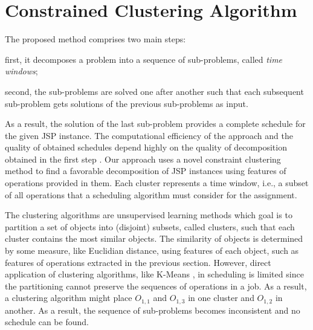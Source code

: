 \documentclass[runningheads]{llncs}
\begin{document}
\section{Constrained Clustering Algorithm}
\label{sec:method}
The proposed method comprises two main steps: 
\begin{enumerate*}[label=\emph{(\roman*)}]
  \item first, it decomposes a problem into a sequence of sub-problems, called \emph{time windows}; 
  \item second, the sub-problems are solved one after another such that each subsequent sub-problem gets solutions of the previous sub-problems as input.
\end{enumerate*}
As a result, the solution of the last sub-problem provides a complete schedule for the given JSP instance.
The computational efficiency of the approach and the quality of obtained schedules depend highly on the quality of decomposition obtained in the first step \cite{zhang2010hybrid,zhai2014decomposition}. 
Our approach uses a novel constraint clustering method to find a favorable decomposition of JSP instances using features of operations provided in them. Each cluster represents a time window, i.e., a subset of all operations that a scheduling algorithm must consider for the assignment.

The clustering algorithms are unsupervised learning methods which goal is to partition a set of objects into (disjoint) subsets, called clusters, such that each cluster contains the most similar objects. 
The similarity of objects is determined by some measure, like Euclidian distance, using features of each object, such as features of operations extracted in the previous section. 
However, direct application of clustering algorithms, like K-Means \cite{Forgy1965ClusterAO}, in scheduling is limited since the partitioning cannot preserve the sequences of operations in a job. As a result, a clustering algorithm might place $O_{1,1}$ and $O_{1,3}$ in one cluster and $O_{1,2}$ in another. As a result, the sequence of sub-problems becomes inconsistent and no schedule can be found. 
\end{document}
